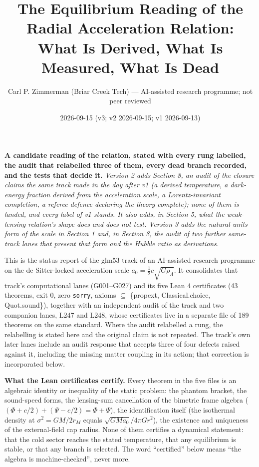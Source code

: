 \documentclass[
  11pt,
]{article}
\title{The Equilibrium Reading of the Radial Acceleration Relation: What
Is Derived, What Is Measured, What Is Dead}
\author{Carl P. Zimmerman (Briar Creek Tech) --- AI-assisted research
programme; not peer reviewed}
\date{2026-09-15 (v3; v2 2026-09-15; v1 2026-09-13)}
\newcounter{none} %
\begin{document}
\maketitle

\textbf{A candidate reading of the relation, stated with every rung
labelled, the audit that relabelled three of them, every dead branch
recorded, and the tests that decide it.} \emph{Version 2 adds Section 8,
an audit of the closure claims the same track made in the day after v1
(a derived temperature, a dark-energy fraction derived from the
acceleration scale, a Lorentz-invariant completion, a referee defence
declaring the theory complete); none of them is landed, and every label
of v1 stands. It also adds, in Section 5, what the weak-lensing
relation's shape does and does not test. Version 3 adds the
natural-units form of the scale in Section 1 and, in Section 8, the
audit of two further same-track lanes that present that form and the
Hubble ratio as derivations.}

This is the status report of the glm53 track of an AI-assisted research
programme on the de Sitter-locked acceleration scale
\(a_0 = \tfrac12 c\sqrt{G\rho_\Lambda}\). It consolidates that track's
computational lanes (G001--G027) and its five Lean 4 certificates (43
theorems, exit 0, zero \texttt{sorry}, axioms \(\subseteq\) \{propext,
Classical.choice, Quot.sound\}), together with an independent audit of
the track and two companion lanes, L247 and L248, whose certificates
live in a separate file of 189 theorems on the same standard. Where the
audit relabelled a rung, the relabelling is stated here and the original
claim is not repeated. The track's own later lanes include an audit
response that accepts three of four defects raised against it, including
the missing matter coupling in its action; that correction is
incorporated below.

\textbf{What the Lean certificates certify.} Every theorem in the five
files is an algebraic identity or inequality of the static problem: the
phantom bracket, the sound-speed forms, the lensing-sum cancellation of
the bimetric frame algebra
(\((\Phi + c/2) + (\Psi - c/2) = \Phi + \Psi\)), the identification
itself (the isothermal density at \(\sigma^2 = GM/2r_M\) equals
\(\sqrt{GMa_0}/4\pi G r^2\)), the existence and uniqueness of the
external-field cap radius. None of them certifies a dynamical statement:
that the cold sector reaches the stated temperature, that any
equilibrium is stable, or that any branch is selected. The word
``certified'' below means ``the algebra is machine-checked'', never
more.
\end{document}
